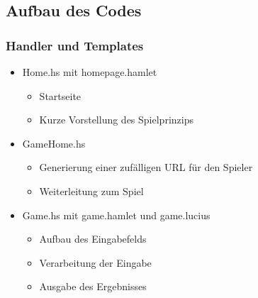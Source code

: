 \documentclass[hyperref={pdfpagelabels=false}]{beamer}
\begin{document}
\subsection{Aufbau des Codes}
\begin{frame}
  \frametitle{Handler und Templates}
  \begin{itemize}
    \item Home.hs mit homepage.hamlet
      \begin{itemize}
        \item Startseite
        \item Kurze Vorstellung des Spielprinzips
      \end{itemize}
    \item GameHome.hs
      \begin{itemize}
        \item Generierung einer zufälligen URL für den Spieler
        \item Weiterleitung zum Spiel
      \end{itemize}
    \item Game.hs mit game.hamlet und game.lucius
      \begin{itemize}
        \item Aufbau des Eingabefelds
        \item Verarbeitung der Eingabe
        \item Ausgabe des Ergebnisses
      \end{itemize}
  \end{itemize}
\end{frame}
\end{document}

